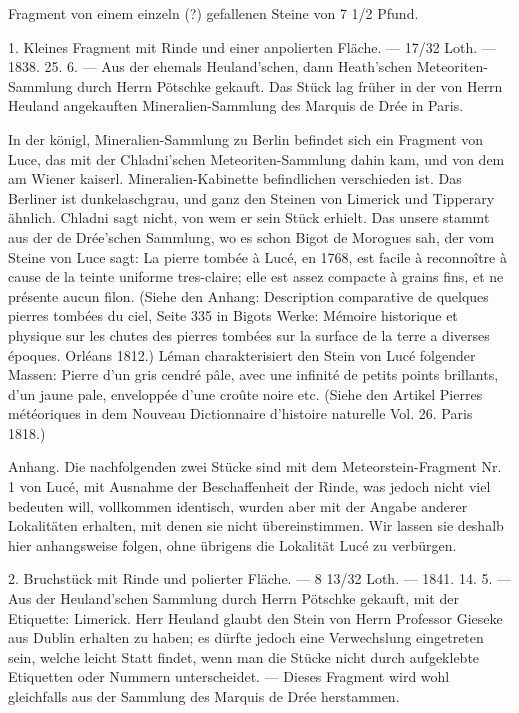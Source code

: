 \documentclass[a4paper, 11pt, oneside, polutonikogreek, german]{article}
\begin{document}
Fragment von einem einzeln (?) gefallenen Steine von 7 1/2 Pfund.

1. Kleines Fragment mit Rinde und einer anpolierten Fläche. — 17/32 Loth. — 1838. 25. 6. — Aus der ehemals Heuland'schen, dann Heath'schen Meteoriten-Sammlung durch Herrn Pötschke gekauft. Das Stück lag früher in der von Herrn Heuland angekauften Mineralien-Sammlung des Marquis de Drée in Paris.

In der königl, Mineralien-Sammlung zu Berlin befindet sich ein Fragment von Luce, das mit der Chladni'schen Meteoriten-Sammlung dahin kam, und von dem am Wiener kaiserl. Mineralien-Kabinette befindlichen verschieden ist. Das Berliner ist dunkelaschgrau, und ganz den Steinen von Limerick und Tipperary ähnlich. Chladni sagt nicht, von wem er sein Stück erhielt. Das unsere stammt aus der de Drée'schen Sammlung, wo es schon Bigot de Morogues sah, der vom Steine von Luce sagt: La pierre tombée à Lucé, en 1768, est facile à reconnoître à cause de la teinte uniforme tres-claire; elle est assez compacte à grains fins, et ne présente aucun filon. (Siehe den Anhang: Description comparative de quelques pierres tombées du ciel, Seite 335 in Bigots Werke: Mémoire historique et physique sur les chutes des pierres tombées sur la surface de la terre a diverses époques. Orléans 1812.) Léman charakterisiert den Stein von Lucé folgender Massen: Pierre d’un gris cendré pâle, avec une infinité de petits points brillants, d'un jaune pale, enveloppée d'une croûte noire etc. (Siehe den Artikel Pierres météoriques in dem Nouveau Dictionnaire d'histoire naturelle Vol. 26. Paris 1818.)

Anhang. Die nachfolgenden zwei Stücke sind mit dem Meteorstein-Fragment Nr. 1 von Lucé, mit Ausnahme der Beschaffenheit der Rinde, was jedoch nicht viel bedeuten will, vollkommen identisch, wurden aber mit der Angabe anderer Lokalitäten erhalten, mit denen sie nicht übereinstimmen. Wir lassen sie deshalb hier anhangsweise folgen, ohne übrigens die Lokalität Lucé zu verbürgen.

2. Bruchstück mit Rinde und polierter Fläche. — 8 13/32 Loth. — 1841. 14. 5. — Aus der Heuland'schen Sammlung durch Herrn Pötschke gekauft, mit der Etiquette: Limerick. Herr Heuland glaubt den Stein von Herrn Professor Gieseke aus Dublin erhalten zu haben; es dürfte jedoch eine Verwechslung eingetreten sein, welche leicht Statt findet, wenn man die Stücke nicht durch aufgeklebte Etiquetten oder Nummern unterscheidet. — Dieses Fragment wird wohl gleichfalls aus der Sammlung des Marquis de Drée herstammen.
\end{document}
